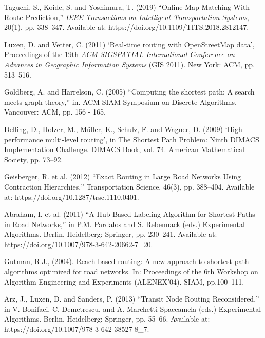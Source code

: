 \begin{thebibliography}{99}
        Taguchi, S., Koide, S. and Yoshimura, T. (2019) “Online Map Matching With Route Prediction,” \textit{IEEE Transactions on Intelligent Transportation Systems}, 20(1), pp. 338–347. Available at: https://doi.org/10.1109/TITS.2018.2812147.

        Luxen, D. and Vetter, C. (2011) ‘Real-time routing with OpenStreetMap data’, Proceedings of the 19th \textit{ACM SIGSPATIAL International Conference on Advances in Geographic Information Systems }(GIS 2011). New York: ACM, pp. 513–516.

        Goldberg, A. and Harrelson, C. (2005) “Computing the shortest path: A search meets graph theory,” in. ACM-SIAM Symposium on Discrete Algorithms. Vancouver: ACM, pp. 156 - 165.
        
        Delling, D., Holzer, M., Müller, K., Schulz, F. and Wagner, D. (2009) ‘High-performance multi-level routing’, in The Shortest Path Problem: Ninth DIMACS Implementation Challenge. DIMACS Book, vol. 74. American Mathematical Society, pp. 73–92.

        Geisberger, R. et al. (2012) “Exact Routing in Large Road Networks Using Contraction Hierarchies,” Transportation Science, 46(3), pp. 388–404. Available at: https://doi.org/10.1287/trsc.1110.0401.

        Abraham, I. et al. (2011) “A Hub-Based Labeling Algorithm for Shortest Paths in Road Networks,” in P.M. Pardalos and S. Rebennack (eds.) Experimental Algorithms. Berlin, Heidelberg: Springer, pp. 230–241. Available at: https://doi.org/10.1007/978-3-642-20662-7\_20.


        Gutman, R.J., (2004). Reach-based routing: A new approach to shortest path algorithms optimized for road networks. In: Proceedings of the 6th Workshop on Algorithm Engineering and Experiments (ALENEX’04). SIAM, pp.100–111.

        Arz, J., Luxen, D. and Sanders, P. (2013) “Transit Node Routing Reconsidered,” in V. Bonifaci, C. Demetrescu, and A. Marchetti-Spaccamela (eds.) Experimental Algorithms. Berlin, Heidelberg: Springer, pp. 55–66. Available at: https://doi.org/10.1007/978-3-642-38527-8\_7.


\end{thebibliography}
